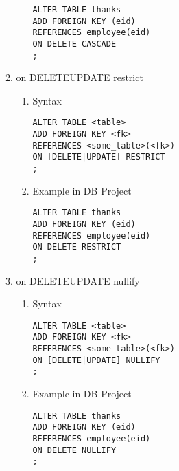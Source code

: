 \documentclass{article}
\begin{document}
\begin{enumerate}
\begin{enumerate}
\begin{enumerate}
            \begin{verbatim}
ALTER TABLE thanks
ADD FOREIGN KEY (eid)
REFERENCES employee(eid)
ON DELETE CASCADE
;
            \end{verbatim}
        \end{enumerate}
        \item on DELETE\textbar UPDATE restrict
        \begin{enumerate}
            \item Syntax
            \begin{verbatim}
ALTER TABLE <table>
ADD FOREIGN KEY <fk>
REFERENCES <some_table>(<fk>)
ON [DELETE|UPDATE] RESTRICT
;
            \end{verbatim}
            \item Example in DB Project
            \begin{verbatim}
ALTER TABLE thanks
ADD FOREIGN KEY (eid)
REFERENCES employee(eid)
ON DELETE RESTRICT
;
            \end{verbatim}
        \end{enumerate}
        \item on DELETE\textbar UPDATE nullify
        \begin{enumerate}
            \item Syntax
            \begin{verbatim}
ALTER TABLE <table>
ADD FOREIGN KEY <fk>
REFERENCES <some_table>(<fk>)
ON [DELETE|UPDATE] NULLIFY
;
            \end{verbatim}
            \item Example in DB Project
            \begin{verbatim}
ALTER TABLE thanks
ADD FOREIGN KEY (eid)
REFERENCES employee(eid)
ON DELETE NULLIFY
;
            \end{verbatim}
        \end{enumerate}
    \end{enumerate}
\end{enumerate}
\end{document}

